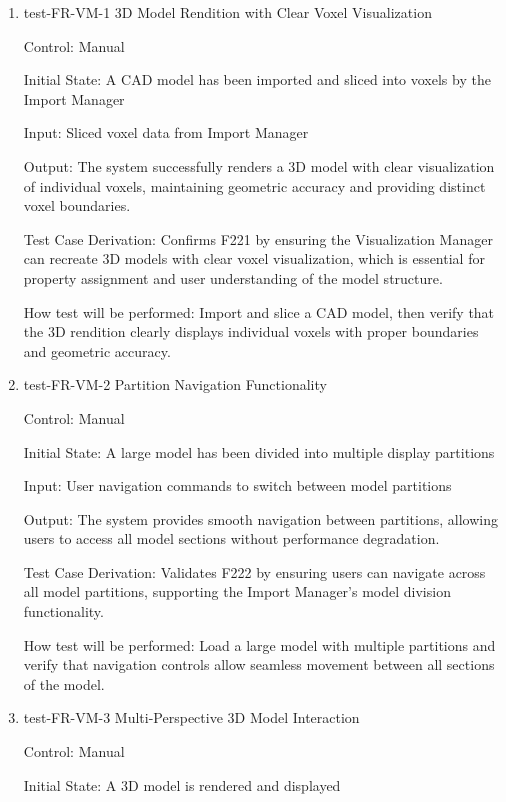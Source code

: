 \documentclass[12pt, titlepage]{article}
\begin{document}
\begin{enumerate}

\item{test-FR-VM-1 3D Model Rendition with Clear Voxel Visualization\\}

Control: Manual
					
Initial State: A CAD model has been imported and sliced into voxels by the Import Manager
					
Input: Sliced voxel data from Import Manager
					
Output: The system successfully renders a 3D model with clear visualization of individual
voxels, maintaining geometric accuracy and providing distinct voxel boundaries.

Test Case Derivation: Confirms F221 by ensuring the Visualization Manager can recreate
3D models with clear voxel visualization, which is essential for property assignment
and user understanding of the model structure.
					
How test will be performed: Import and slice a CAD model, then verify that the 3D
rendition clearly displays individual voxels with proper boundaries and geometric accuracy.

\item{test-FR-VM-2 Partition Navigation Functionality\\}

Control: Manual
					
Initial State: A large model has been divided into multiple display partitions
					
Input: User navigation commands to switch between model partitions
					
Output: The system provides smooth navigation between partitions, allowing users to
access all model sections without performance degradation.

Test Case Derivation: Validates F222 by ensuring users can navigate across all model
partitions, supporting the Import Manager's model division functionality.
					
How test will be performed: Load a large model with multiple partitions and verify
that navigation controls allow seamless movement between all sections of the model.

\item{test-FR-VM-3 Multi-Perspective 3D Model Interaction\\}

Control: Manual
					
Initial State: A 3D model is rendered and displayed
					

\end{enumerate}
\end{document}
